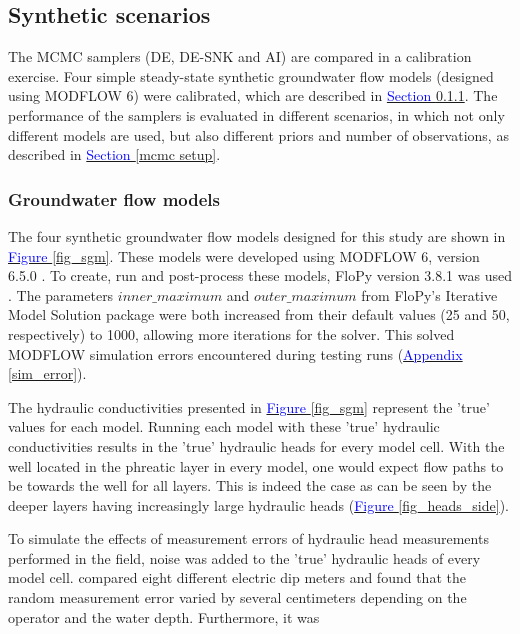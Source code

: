 \subsection{Synthetic scenarios}\label{mcmc exp}
The MCMC samplers (DE, DE-SNK and AI) are compared in a calibration exercise. Four simple steady-state synthetic groundwater flow models (designed using MODFLOW 6) were calibrated, which are described in \hyperref[gfm]{\textcolor{blue}{Section }\ref{gfm}}. The performance of the samplers is evaluated in different scenarios, in which not only different models are used, but also different priors and number of observations, as described in \hyperref[mcmc setup]{\textcolor{blue}{Section }\ref{mcmc setup}}.

\subsubsection{Groundwater flow models}\label{gfm}
The four synthetic groundwater flow models designed for this study are shown in \hyperref[fig_sgm]{\textcolor{blue}{Figure }\ref{fig_sgm}}. These models were developed using MODFLOW 6, version 6.5.0 \citep{langevin2017modflow}. To create, run and post-process these models, FloPy version 3.8.1 was used \citep{hughes2023flopy}. The parameters $inner\_maximum$ and $outer\_maximum$ from FloPy's Iterative Model Solution package were both increased from their default values (25 and 50, respectively) to 1000, allowing more iterations for the solver. This solved MODFLOW simulation errors encountered during testing runs (\hyperref[sim_error]{\textcolor{blue}{Appendix }\ref{sim_error}}). 

The hydraulic conductivities presented in \hyperref[fig_sgm]{\textcolor{blue}{Figure }\ref{fig_sgm}} represent the 'true' values for each model. Running each model with these 'true' hydraulic conductivities results in the 'true' hydraulic heads for every model cell. With the well located in the phreatic layer in every model, one would expect flow paths to be towards the well for all layers. This is indeed the case as can be seen by the deeper layers having increasingly large hydraulic heads (\hyperref[fig_heads_side]{\textcolor{blue}{Figure }\ref{fig_heads_side}}).

To simulate the effects of measurement errors of hydraulic head measurements performed in the field, noise was added to the ’true’ hydraulic heads of every model cell. \cite{rau2019error} compared eight different electric dip meters and found that the random measurement error varied by several centimeters depending on the operator and the water depth. Furthermore, it was

